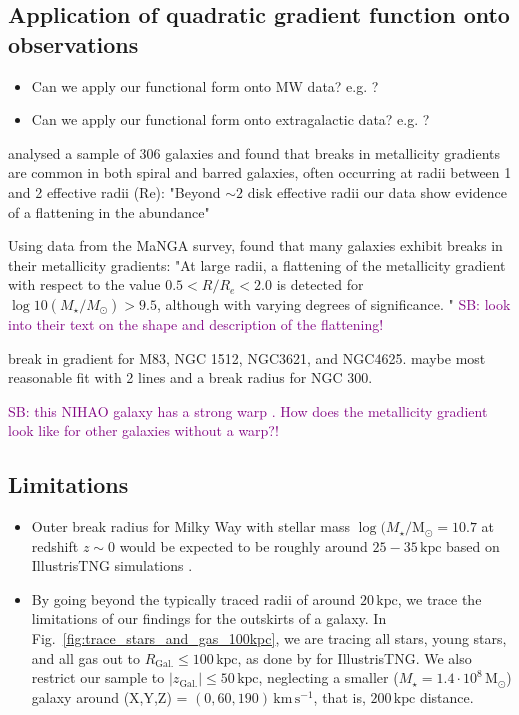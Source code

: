 \documentclass[fleqn,usenatbib]{mnras}
\newcommand{\SB}[1]{{\textcolor{purple}{SB: #1}}}
\begin{document}
\subsection{Application of quadratic gradient function onto observations}

\begin{itemize}
    \item Can we apply our functional form onto MW data? e.g. \citet{Yong2012, Andrievsky2004, Genovali2014}?
    \item Can we apply our functional form onto extragalactic data? e.g. \citet{Chen2023, Bresolin2012}?
\end{itemize}

\citet{Sanchez2014} analysed a sample of 306 galaxies and found that breaks in metallicity gradients are common in both spiral and barred galaxies, often occurring at radii between 1 and 2 effective radii (Re): "Beyond $\sim 2$ disk effective radii our data show evidence of a flattening in the abundance"

Using data from the MaNGA survey, \citet{Belfiore2017} found that many galaxies exhibit breaks in their metallicity gradients: "At large radii, a flattening of the metallicity gradient with respect to the value $0.5 < R/R_e < 2.0$ is detected for $\log10(M_\star/M_\odot) > 9.5$, although with varying degrees of significance. " \SB{look into their text on the shape and description of the flattening!}

\citet{Bresolin2012} break in gradient for M83, NGC 1512, NGC3621, and NGC4625.
\citet{Vlajic2009} maybe most reasonable fit with 2 lines and a break radius for NGC 300.

\SB{this NIHAO galaxy has a strong warp \citep[compared to other NIHAO-UHD simulations][]{Buck2020}. How does the metallicity gradient look like for other galaxies without a warp?!}

\subsection{Limitations}

\begin{itemize}
    \item Outer break radius for Milky Way with stellar mass $\log(M_\star/\mathrm{M_\odot} = 10.7$ \citep{BlandHawthorn_Gerhard2016} at redshift $z \sim 0$ would be expected to be roughly around $25-35\,\mathrm{kpc}$ based on IllustrisTNG simulations \citep[][their Appendix A]{Garcia2023}.
    \item By going beyond the typically traced radii of around $20\,\mathrm{kpc}$, we trace the limitations of our findings for the outskirts of a galaxy. In Fig.~\ref{fig:trace_stars_and_gas_100kpc}, we are tracing all stars, young stars, and all gas out to $R_\mathrm{Gal.} \leq 100\,\mathrm{kpc}$, as done by \citet{Garcia2023} for IllustrisTNG. We also restrict our sample to $\vert z_\mathrm{Gal.} \vert \leq 50\,\mathrm{kpc}$, neglecting a smaller ($M_\star = 1.4\cdot 10^8\,\mathrm{M_\odot}$) galaxy around (X,Y,Z) = $(0,60,190)\,\mathrm{km\,s^{-1}}$, that is, $200\,\mathrm{kpc}$ distance.
\end{itemize}
\end{document}
